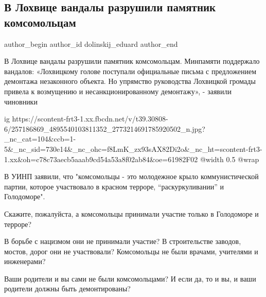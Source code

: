  
 
 
 
 
 
\subsection{В Лохвице вандалы разрушили памятник комсомольцам}
\label{sec:14_11_2021.fb.dolinskij_eduard.1.lohvica_pamjatnik_komsomol}
 
\ifcmt
 author_begin
   author_id dolinskij_eduard
 author_end
\fi

В Лохвице вандалы разрушили памятник комсомольцам. Минпамяти поддержало
вандалов: «Лохвицкому голове поступали официальные письма с предложением
демонтажа незаконного объекта. Но упрямство руководства Лохвицкой громады
привела к возмущению и несанкционированному демонтажу», - заявили чиновники

\ifcmt
  ig https://scontent-frt3-1.xx.fbcdn.net/v/t39.30808-6/257186869_4895540103811352_2773214691785920502_n.jpg?_nc_cat=104&ccb=1-5&_nc_sid=730e14&_nc_ohc=f8LmK_zx93sAX82Di2o&_nc_ht=scontent-frt3-1.xx&oh=c78c73aecb5aaab9cd54a53a8f02ab84&oe=61982F02
  @width 0.5
  @wrap 
\fi

В УИНП заявили, что "комсомольцы - это молодежное крыло коммунистической
партии, которое участвовало в красном терроре, “раскуркуливании” и Голодоморе".

Скажите, пожалуйста, а комсомольцы принимали участие только в Голодоморе и
терроре? 

В борьбе с нацизмом они не принимали участие? В строительстве заводов, мостов,
дорог они не участвовали? Комсомольцы не были врачами, учителями и инженерами? 

Ваши родители и вы сами не были комсомольцами? И если да, то и вы, и ваши
родители должны быть демонтированы?

